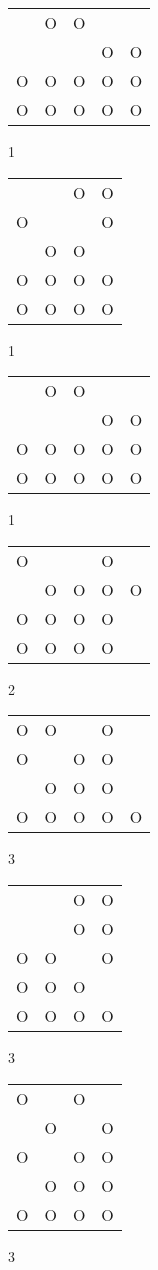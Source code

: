 \begin{tabular}{|m{0.2cm}m{0.2cm}m{0.2cm}m{0.2cm}m{0.2cm}|}\hline
 &O&O& & \\
 & & &O&O\\
O&O&O&O&O\\
O&O&O&O&O\\
\hline\end{tabular}1
\begin{tabular}{|m{0.2cm}m{0.2cm}m{0.2cm}m{0.2cm}|}\hline
 & &O&O\\
O& & &O\\
 &O&O& \\
O&O&O&O\\
O&O&O&O\\
\hline\end{tabular}1
\begin{tabular}{|m{0.2cm}m{0.2cm}m{0.2cm}m{0.2cm}m{0.2cm}|}\hline
 &O&O& & \\
 & & &O&O\\
O&O&O&O&O\\
O&O&O&O&O\\
\hline\end{tabular}1
\begin{tabular}{|m{0.2cm}m{0.2cm}m{0.2cm}m{0.2cm}m{0.2cm}|}\hline
O& & &O& \\
 &O&O&O&O\\
O&O&O&O& \\
O&O&O&O& \\
\hline\end{tabular}2
\begin{tabular}{|m{0.2cm}m{0.2cm}m{0.2cm}m{0.2cm}m{0.2cm}|}\hline
O&O& &O& \\
O& &O&O& \\
 &O&O&O& \\
O&O&O&O&O\\
\hline\end{tabular}3
\begin{tabular}{|m{0.2cm}m{0.2cm}m{0.2cm}m{0.2cm}|}\hline
 & &O&O\\
 & &O&O\\
O&O& &O\\
O&O&O& \\
O&O&O&O\\
\hline\end{tabular}3
\begin{tabular}{|m{0.2cm}m{0.2cm}m{0.2cm}m{0.2cm}|}\hline
O& &O& \\
 &O& &O\\
O& &O&O\\
 &O&O&O\\
O&O&O&O\\
\hline\end{tabular}3
